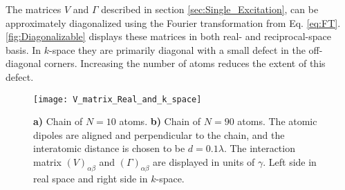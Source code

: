 \noindent
The matrices $ V $ and $ \Gamma $ described in section \ref{sec:Single_Excitation}, can be approximately diagonalized
using the Fourier transformation from Eq. \eqref{eq:FT}.
\autoref{fig:Diagonalizable} displays these matrices in both real- and reciprocal-space basis.
In $k$-space they are primarily diagonal with a small defect in the off-diagonal corners.
Increasing the number of atoms reduces the extent of this defect.

\begin{figure}[ht]
    \centering
    \texttt{[image: V\_matrix\_Real\_and\_k\_space]}
    \caption{\textbf{a)} Chain of $N = 10 $ atoms.
    \textbf{b)} Chain of $N = 90 $ atoms.
    The atomic dipoles are aligned and perpendicular to the chain, and the interatomic distance is chosen to be $ d = 0.1 \lambda $.
    The interaction matrix $ (V)_{\alpha \beta} $ and $ (\Gamma)_{\alpha \beta} $ are displayed in units of $ \gamma $.
    Left side in real space and right side in $k$-space.}
    \label{fig:Diagonalizable}
\end{figure}